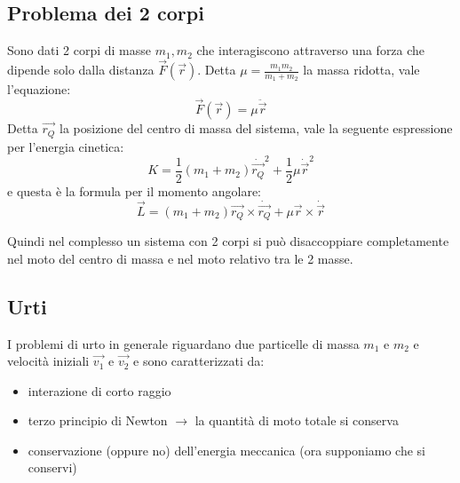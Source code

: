 \documentclass[../main.tex]{subfiles}
\begin{document}
\subsection{Problema dei 2 corpi}
Sono dati 2 corpi di masse $m_1,m_2$ che interagiscono attraverso una forza che dipende 
solo dalla distanza $\vec F(\vec r)$.
Detta $\mu=\frac{m_1m_2}{m_1+m_2}$ la massa ridotta, vale l'equazione:
\begin{equation}\label{ForzaMassaRidotta}
	\vec F(\vec r)=\mu \ddot {\vec{r}}
\end{equation}
Detta $\overrightarrow{ r_Q }$ la posizione del centro di massa del sistema, vale la seguente espressione per l'energia cinetica:
\begin{equation}\label{Cinetica2Corpi}
	K=\frac12(m_1+m_2)\dot{\overrightarrow{r_Q}}^2+\frac12\mu\dot{\vec{r}}^2
\end{equation}
e questa è la formula per il momento angolare:
\begin{equation}\label{Momento2Corpi}
	\vec L=(m_1+m_2)\overrightarrow{r_Q}\times \dot{\overrightarrow{r_Q}}+\mu \vec r\times\dot{\vec r}
\end{equation}

Quindi nel complesso un sistema con 2 corpi si può disaccoppiare completamente nel moto del centro di massa e nel
moto relativo tra le 2 masse.

\subsection{Urti}
I problemi di urto in generale riguardano due particelle di massa $m_1$ e $m_2$ e velocità iniziali $\overrightarrow {v_1}$ e $\overrightarrow {v_2}$ e sono caratterizzati da:
\begin{itemize}
 \item interazione di corto raggio
 \item terzo principio di Newton $\rightarrow$ la quantità di moto totale si conserva
 \item conservazione (oppure no) dell'energia meccanica (ora supponiamo che si conservi)
\end{itemize}
\end{document}
